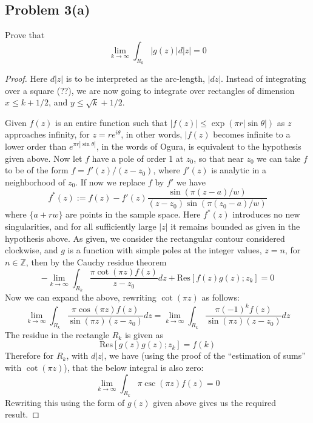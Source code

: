 \documentclass{article}[12pt]
\def\ZZ{{\mathbb Z}}
\begin{document}
\subsection*{Problem 3(a)}Prove that
\[
\lim_{k\to\infty} \int_{R_k}|g(z)|d|z|=0
\]
\begin{proof}
Here $d|z|$ is to be interpreted as the arc-length, $|dz|$.
Instead of integrating over a square (??), we are now going to
integrate over rectangles of dimension $x\le k+1/2$, and $y\le \sqrt{k}+1/2$.

  Given $f(z)$ is an entire function such that $|f(z)|\le \exp(\pi r |\sin \theta|)$
  as $z$ approaches infinity, for $z=re^{i\theta}$, in other words,
  $|f(z)$ becomes infinite to a lower order than $e^{\pi r|\sin\theta|}$, in the
  words of Ogura, is equivalent to the hypothesis given above.
  Now let $f$ have a pole of order 1 at $z_0$, so that near $z_0$ we can take
  $f$ to be of the form $f=f'(z)/(z-z_0)$, where $f'(z)$ is analytic in a
  neighborhood of $z_0$. If now we replace $f$ by $f'$ we have
  \[
  f^*(z) := f(z)-f'(z)\frac{\sin(\pi(z-a)/w)}{(z-z_0)\sin(\pi(z_0-a)/w)}
  \]
  where $\{a+rw\}$ are points in the sample space.
  Here $f^*(z)$ introduces no new singularities, and for all sufficiently
  large $|z|$ it remains bounded as given in the hypothesis above.
  As given, we consider the rectangular contour considered clockwise,
  and $g$ is a function with simple poles at the integer values, $z=n$,
  for $n\in\ZZ$, then by the Cauchy residue theorem
  \[
-  \lim_{k\to\infty} \int_{R_k} \frac{\pi \cot(\pi z) f(z)}{z-z_0} dz +
\mbox{Res}[f(z)g(z);z_k] = 0
  \]
  Now we can expand the above, rewriting $\cot(\pi z)$ as follows:
  \[
  \lim_{k\to\infty} \int_{R_k} \frac{\pi \cos(\pi z) f(z)}{\sin(\pi z)(z-z_0)} dz = 
  \lim_{k\to\infty} \int_{R_k} \frac{\pi (-1)^k f(z)}{\sin(\pi z)(z-z_0)} dz
  \]
  The residue in the rectangle $R_k$ is given as
  \[
  \mbox{Res}[g(z)g(z);z_k] = f(k)
  \]
  Therefore for $R_k$, with $d|z|$, we have (using the proof of the
  ``estimation of sums'' with $\cot(\pi z)$), that the below integral is
also zero:
  \[
  \lim_{k\to\infty} \int_{R_k} \pi \csc(\pi z) f(z) = 0
  \]
  Rewriting this using the form of $g(z)$ given above gives us
  the required result.
\end{proof}
\end{document}
